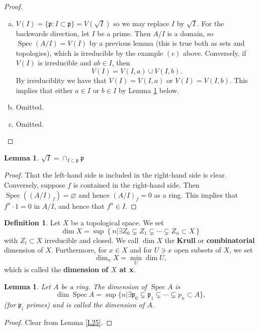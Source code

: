\documentclass{article}
\newcommand{\fr}{\mathfrak}
\DeclareMathOperator{\Spec}{Spec}
\theoremstyle{plain}
\newtheorem{lem}[thm]{Lemma}
\theoremstyle{definition}
\newtheorem{defn}{Definition}
\theoremstyle{remark}
\begin{document}
\begin{proof}\hspace{1mm}
\begin{enumerate}[(a)]
\item $V(I)=\{\fr p:I\subset\fr p\}=V(\sqrt{I})$ so we may replace $I$ by $\sqrt{I}$. For the backwards direction, let $I$ be a prime. Then $A/I$ is a domain, so $\Spec(A/I)=V(I)$ by a previous lemma (this is true both as sets and topologies), which is irreducible by the example $(c)$ above. Conversely, if $V(I)$ is irreducible and $ab\in I$, then
\[V(I)=V(I,a)\cup V(I,b).\]
By irreduciblity we have that $V(I)=V(I,a)$ or $V(I)=V(I,b)$. This implies that either $a\in I$ or $b\in I$ by Lemma \ref{L26} below.
\item Omitted.
\item Omitted.
\end{enumerate}
\end{proof}

\begin{lem}
\label{L26}
$\sqrt{I}=\cap_{I\subset\fr p} \fr p$
\end{lem}
\begin{proof}
That the left-hand side is included in the right-hand side is clear. Conversely, suppose $f$ is contained in the right-hand side. Then $\Spec((A/I)_f)=\varnothing$ and hence $(A/I)_f=0$ as a ring. This implies that $f^n\cdot 1=0$ in $A/I$, and hence that $f^n\in I$.
\end{proof}

\begin{defn}
Let $X$ be a topological space. We set
\[\dim X=\sup\left\{ n | \exists Z_0 \subsetneq Z_1\subsetneq \cdots\subsetneq Z_n\subset X \right\}\]
with $Z_i\subset X$ irreducible and closed. We call $\dim X$ the \textbf{Krull} or \textbf{combinatorial} dimension of $X$. Furthermore, for $x\in X$ and for $U\ni x$ open subsets of $X$, we set
\[\dim_x X=\min_U\dim U,\]
which is called the \textbf{dimension of $X$ at x}.
\end{defn}

\begin{lem}
\label{L27}
Let $A$ be a ring. The dimension of $\Spec A$ is
\[\dim\Spec A=\sup\{n | \exists \fr p_0\subsetneq\fr p_1\subsetneq\cdots\subsetneq p_n\subset A \},\]
(for $\fr p_i$ primes) and is called the dimension of $A$.
\end{lem}
\begin{proof}
Clear from Lemma \ref{L25}.
\end{proof}
\end{document}
